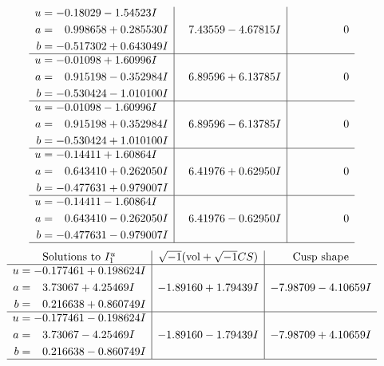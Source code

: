 \documentclass[1p]{elsarticle_modified}
\theoremstyle{definition}
\newcommand{\I}{\sqrt{-1}}
\begin{document}
$$\begin{array}{c|c|c}
\begin{aligned}
u &= -0.18029 - 1.54523 I \\
a &= \phantom{-}0.998658 + 0.285530 I \\
b &= -0.517302 + 0.643049 I\end{aligned}
 & \phantom{-}7.43559 - 4.67815 I & \phantom{-0.000000 } 0 \\ \hline\begin{aligned}
u &= -0.01098 + 1.60996 I \\
a &= \phantom{-}0.915198 - 0.352984 I \\
b &= -0.530424 - 1.010100 I\end{aligned}
 & \phantom{-}6.89596 + 6.13785 I & \phantom{-0.000000 } 0 \\ \hline\begin{aligned}
u &= -0.01098 - 1.60996 I \\
a &= \phantom{-}0.915198 + 0.352984 I \\
b &= -0.530424 + 1.010100 I\end{aligned}
 & \phantom{-}6.89596 - 6.13785 I & \phantom{-0.000000 } 0 \\ \hline\begin{aligned}
u &= -0.14411 + 1.60864 I \\
a &= \phantom{-}0.643410 + 0.262050 I \\
b &= -0.477631 + 0.979007 I\end{aligned}
 & \phantom{-}6.41976 + 0.62950 I & \phantom{-0.000000 } 0 \\ \hline\begin{aligned}
u &= -0.14411 - 1.60864 I \\
a &= \phantom{-}0.643410 - 0.262050 I \\
b &= -0.477631 - 0.979007 I\end{aligned}
 & \phantom{-}6.41976 - 0.62950 I & \phantom{-0.000000 } 0\\
 \hline 
 \end{array}$$\newpage$$\begin{array}{c|c|c}  
\text{Solutions to }I^u_{1}& \I (\text{vol} + \sqrt{-1}CS) & \text{Cusp shape}\\
 \hline 
\begin{aligned}
u &= -0.177461 + 0.198624 I \\
a &= \phantom{-}3.73067 + 4.25469 I \\
b &= \phantom{-}0.216638 + 0.860749 I\end{aligned}
 & -1.89160 + 1.79439 I & -7.98709 - 4.10659 I \\ \hline\begin{aligned}
u &= -0.177461 - 0.198624 I \\
a &= \phantom{-}3.73067 - 4.25469 I \\
b &= \phantom{-}0.216638 - 0.860749 I\end{aligned}
 & -1.89160 - 1.79439 I & -7.98709 + 4.10659 I\\
 \hline 
 \end{array}$$\newpage\newpage\renewcommand{\arraystretch}{1}
\end{document}
